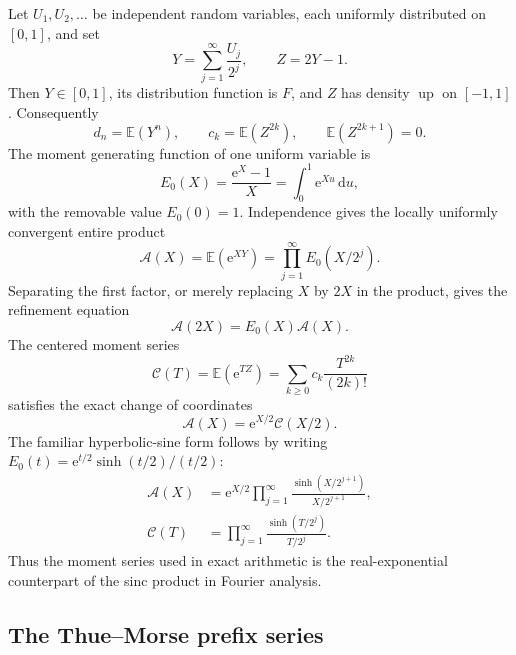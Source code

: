 \documentclass[11pt,oneside]{article}
\theoremstyle{definition}
\theoremstyle{remark}
\newcommand{\Up}{\operatorname{up}}
\newcommand{\e}{\mathrm e}
\newcommand{\dd}{\,\mathrm d}
\newcommand{\E}{\mathbb E}
\begin{document}
Let $U_1,U_2,\ldots$ be independent random variables, each uniformly distributed on
$[0,1]$, and set
\begin{equation}
 Y=\sum_{j=1}^{\infty}\frac{U_j}{2^j},
 \qquad Z=2Y-1.                                             \label{dyadicweb:eq:Y-Z-def}
\end{equation}
Then $Y\in[0,1]$, its distribution function is $F$, and $Z$ has density $\Up$ on $[-1,1]$.
Consequently
\begin{equation}
 d_n=\E(Y^n),\qquad c_k=\E(Z^{2k}),\qquad \E(Z^{2k+1})=0. \label{dyadicweb:eq:prob-moments}
\end{equation}
The moment generating function of one uniform variable is
\[
 E_0(X)=\frac{\e^X-1}{X}=\int_0^1\e^{Xu}\dd u,
\]
with the removable value $E_0(0)=1$.  Independence gives the locally uniformly convergent
entire product
\begin{equation}
 \mathscr A(X)=\E(\e^{XY})
 =\prod_{j=1}^{\infty}E_0(X/2^j).                          \label{dyadicweb:eq:A-product}
\end{equation}
Separating the first factor, or merely replacing $X$ by $2X$ in the product, gives the
refinement equation
\begin{equation}
 \mathscr A(2X)=E_0(X)\mathscr A(X).                       \label{dyadicweb:eq:A-refinement}
\end{equation}
The centered moment series
\begin{equation}
 \mathscr C(T)=\E(\e^{TZ})
 =\sum_{k\ge0}c_k\frac{T^{2k}}{(2k)!}                     \label{dyadicweb:eq:C-def}
\end{equation}
satisfies the exact change of coordinates
\begin{equation}
 \boxed{\mathscr A(X)=\e^{X/2}\mathscr C(X/2).}           \label{dyadicweb:eq:A-C-transform}
\end{equation}
The familiar hyperbolic-sine form follows by writing
$E_0(t)=\e^{t/2}\sinh(t/2)/(t/2)$:
\begin{align}
 \mathscr A(X)
 &=\e^{X/2}\prod_{j=1}^{\infty}
   \frac{\sinh(X/2^{j+1})}{X/2^{j+1}},                    \label{dyadicweb:eq:A-sinh-product}\\
 \mathscr C(T)
 &=\prod_{j=1}^{\infty}\frac{\sinh(T/2^j)}{T/2^j}.        \label{dyadicweb:eq:C-sinh-product}
\end{align}
Thus the moment series used in exact arithmetic is the real-exponential counterpart of the
sinc product in Fourier analysis.

\subsection{The Thue--Morse prefix series}
\end{document}
